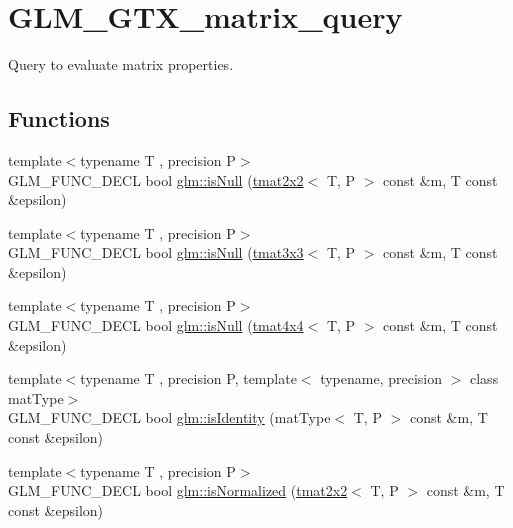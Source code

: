 \hypertarget{group__gtx__matrix__query}{}\section{G\+L\+M\+\_\+\+G\+T\+X\+\_\+matrix\+\_\+query}
\label{group__gtx__matrix__query}


Query to evaluate matrix properties.  


\subsection*{Functions}
\begin{DoxyCompactItemize}
\item 
{\footnotesize template$<$typename T , precision P$>$ }\\G\+L\+M\+\_\+\+F\+U\+N\+C\+\_\+\+D\+E\+CL bool \hyperlink{group__gtx__matrix__query_ga37e535cbeaea383b8c1247b98875cd4b}{glm\+::is\+Null} (\hyperlink{structglm_1_1tmat2x2}{tmat2x2}$<$ T, P $>$ const \&m, T const \&epsilon)
\item 
{\footnotesize template$<$typename T , precision P$>$ }\\G\+L\+M\+\_\+\+F\+U\+N\+C\+\_\+\+D\+E\+CL bool \hyperlink{group__gtx__matrix__query_gac67a5c7e029a84b74b02ac9599b8972d}{glm\+::is\+Null} (\hyperlink{structglm_1_1tmat3x3}{tmat3x3}$<$ T, P $>$ const \&m, T const \&epsilon)
\item 
{\footnotesize template$<$typename T , precision P$>$ }\\G\+L\+M\+\_\+\+F\+U\+N\+C\+\_\+\+D\+E\+CL bool \hyperlink{group__gtx__matrix__query_ga326de496972051413c7b44b85fc9cb6e}{glm\+::is\+Null} (\hyperlink{structglm_1_1tmat4x4}{tmat4x4}$<$ T, P $>$ const \&m, T const \&epsilon)
\item 
{\footnotesize template$<$typename T , precision P, template$<$ typename, precision $>$ class mat\+Type$>$ }\\G\+L\+M\+\_\+\+F\+U\+N\+C\+\_\+\+D\+E\+CL bool \hyperlink{group__gtx__matrix__query_gafc1ce12c738b8c5d007179e615609330}{glm\+::is\+Identity} (mat\+Type$<$ T, P $>$ const \&m, T const \&epsilon)
\item 
{\footnotesize template$<$typename T , precision P$>$ }\\G\+L\+M\+\_\+\+F\+U\+N\+C\+\_\+\+D\+E\+CL bool \hyperlink{group__gtx__matrix__query_ga11a8d5cdb36496b85f61e4f5f7f2602c}{glm\+::is\+Normalized} (\hyperlink{structglm_1_1tmat2x2}{tmat2x2}$<$ T, P $>$ const \&m, T const \&epsilon)

\end{DoxyCompactItemize}
